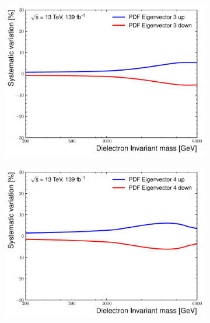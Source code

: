 \begin{figure}[h!]
\begin{subfigure}[b]{0.42\textwidth}
        \centering
        \includegraphics[width=\textwidth]{figures/analysis/datamc/Uncertainties/theory/ee/backgroundTemplate_KF_PDF_EV3.pdf}
        \label{fig:uncert:eepdfvar3}
    \end{subfigure}
    \begin{subfigure}[b]{0.42\textwidth}
        \centering
        \includegraphics[width=\textwidth]{figures/analysis/datamc/Uncertainties/theory/ee/backgroundTemplate_KF_PDF_EV4.pdf}
        \label{fig:uncert:eepdfvar4}
    \end{subfigure}
    \begin{subfigure}[b]{0.42\textwidth}
        \centering

\end{subfigure}
\end{figure}
